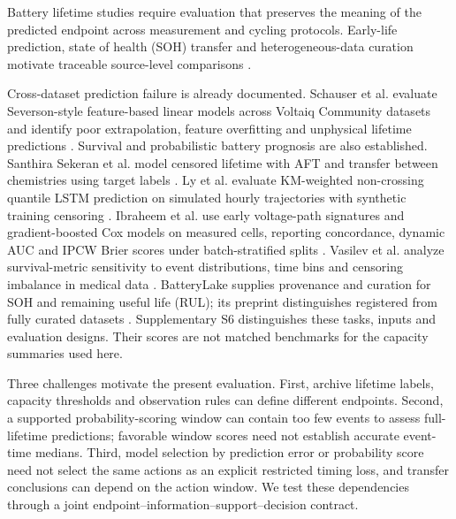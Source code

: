 \documentclass[preprint,12pt]{elsarticle}
\begin{document}
Battery lifetime studies require evaluation that preserves the meaning of the predicted endpoint across measurement and cycling protocols. Early-life prediction, state of health (SOH) transfer and heterogeneous-data curation motivate traceable source-level comparisons \citep{severson2019,attia2020,attia2026,wang2024pin,tang2024ae,ledeng2026,zhu2026lake}.

Cross-dataset prediction failure is already documented. Schauser et al. evaluate Severson-style feature-based linear models across Voltaiq Community datasets and identify poor extrapolation, feature overfitting and unphysical lifetime predictions \citep{schauser2022}. Survival and probabilistic battery prognosis are also established. Santhira Sekeran et al. model censored lifetime with AFT and transfer between chemistries using target labels \citep{sekeran2022}. Ly et al. evaluate KM-weighted non-crossing quantile LSTM prediction on simulated hourly trajectories with synthetic training censoring \citep{ly2023}. Ibraheem et al. use early voltage-path signatures and gradient-boosted Cox models on measured cells, reporting concordance, dynamic AUC and IPCW Brier scores under batch-stratified splits \citep{ibraheem2025}. Vasilev et al. analyze survival-metric sensitivity to event distributions, time bins and censoring imbalance in medical data \citep{vasilev2023}. BatteryLake supplies provenance and curation for SOH and remaining useful life (RUL); its preprint distinguishes registered from fully curated datasets \citep{zhu2026lake}. Supplementary S6 distinguishes these tasks, inputs and evaluation designs. Their scores are not matched benchmarks for the capacity summaries used here.

Three challenges motivate the present evaluation. First, archive lifetime labels, capacity thresholds and observation rules can define different endpoints. Second, a supported probability-scoring window can contain too few events to assess full-lifetime predictions; favorable window scores need not establish accurate event-time medians. Third, model selection by prediction error or probability score need not select the same actions as an explicit restricted timing loss, and transfer conclusions can depend on the action window. We test these dependencies through a joint endpoint--information--support--decision contract.
\end{document}
